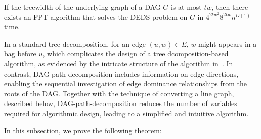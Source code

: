 \documentclass[runningheads]{llncs}
\theoremstyle{plain}
\theoremstyle{definition}
\begin{document}

\begin{proposition}
    If the treewidth of the underlying graph of a DAG \(G\) is at most \(tw\), then there exists an FPT algorithm that solves the DEDS problem on \(G\) in \(4^{2tw^2} 8^{2tw} n^{O(1)}\) time.  
\end{proposition}

In a standard tree decomposition, for an edge $(u, w) \in E$, $w$ might appears in a bag before $u$, which complicates the design of a tree dcomposition-based algorithm, as evidenced by the intricate structure of the algorithm in~\cite{art22}.
%
%
In contrast, DAG-path-decomposition includes information on edge directions, enabling the sequential investigation of edge dominance relationships from the roots of the DAG.  
Together with the technique of converting a line graph, described below, DAG-path-decomposition reduces the number of variables required for algorithmic design, leading to a simplified and intuitive algorithm. 

In this subsection, we prove the following theorem:  
\end{document}
